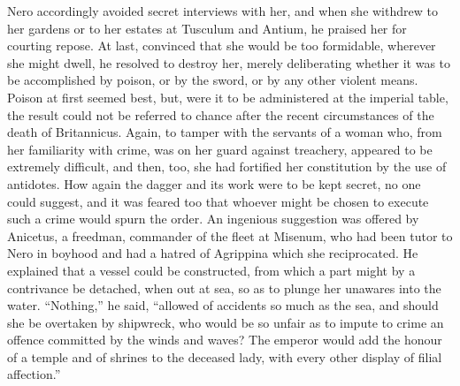 
Nero accordingly avoided secret interviews with her, and when she withdrew to her gardens or to her estates at Tusculum and Antium, he praised her for courting repose. At last, convinced that she would be too formidable, wherever she might dwell, he resolved to destroy her, merely deliberating whether it was to be accomplished by poison, or by the sword, or by any other violent means. Poison at first seemed best, but, were it to be administered at the imperial table, the result could not be referred to chance after the recent circumstances of the death of Britannicus. Again, to tamper with the servants of a woman who, from her familiarity with crime, was on her guard against treachery, appeared to be extremely difficult, and then, too, she had fortified her constitution by the use of antidotes. How again the dagger and its work were to be kept secret, no one could suggest, and it was feared too that whoever might be chosen to execute such a crime would spurn the order. An ingenious suggestion was offered by Anicetus, a freedman, commander of the fleet at Misenum, who had been tutor to Nero in boyhood and had a hatred of Agrippina which she reciprocated. He explained that a vessel could be constructed, from which a part might by a contrivance be detached, when out at sea, so as to plunge her unawares into the water. ``Nothing,'' he said, ``allowed of accidents so much as the sea, and should she be overtaken by shipwreck, who would be so unfair as to impute to crime an offence committed by the winds and waves? The emperor would add the honour of a temple and of shrines to the deceased lady, with every other display of filial affection.''


